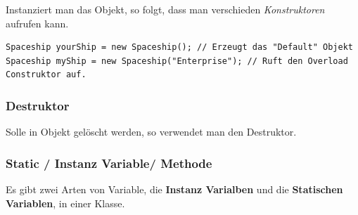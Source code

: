 Instanziert man das Objekt, so folgt, dass man verschieden \textit{Konstruktoren} aufrufen kann.
\begin{lstlisting}[style=C++]
Spaceship yourShip = new Spaceship(); // Erzeugt das "Default" Objekt
Spaceship myShip = new Spaceship("Enterprise"); // Ruft den Overload Construktor auf.
\end{lstlisting}
\subsubsection{Destruktor}
Solle in Objekt gelöscht werden, so verwendet man den Destruktor.

\subsubsection{Static / Instanz Variable/ Methode}
Es gibt zwei Arten von Variable, die \textbf{Instanz Varialben} und die \textbf{Statischen Variablen}, in einer Klasse. 
